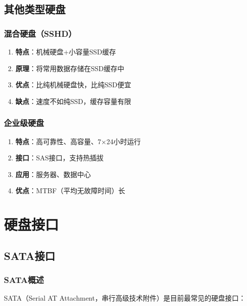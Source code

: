 \documentclass[12pt,UTF8]{ctexbook}
\begin{document}
\chapter{其他类型硬盘}

\section{混合硬盘（SSHD）}

\begin{enumerate}
    \item \textbf{特点}：机械硬盘+小容量SSD缓存
    \item \textbf{原理}：将常用数据存储在SSD缓存中
    \item \textbf{优点}：比纯机械硬盘快，比纯SSD便宜
    \item \textbf{缺点}：速度不如纯SSD，缓存容量有限
\end{enumerate}

\section{企业级硬盘}

\begin{enumerate}
    \item \textbf{特点}：高可靠性、高容量、7×24小时运行
    \item \textbf{接口}：SAS接口，支持热插拔
    \item \textbf{应用}：服务器、数据中心
    \item \textbf{优点}：MTBF（平均无故障时间）长
\end{enumerate}

\part{硬盘接口}

\chapter{SATA接口}

\section{SATA概述}

SATA（Serial AT Attachment，串行高级技术附件）是目前最常见的硬盘接口：
\end{document}
